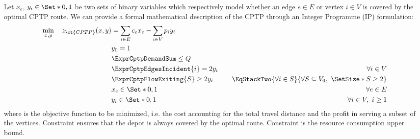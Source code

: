Let $x_{e}$, $y_{i} \in \Set*{0, 1}$ be two sets of binary variables which respectively
model whether an edge $e \in E$ or vertex $i \in V$ is covered by the optimal CPTP route.
We can provide a formal mathematical description of the CPTP through an Integer Programme (IP) formulation:
\begin{align}
	\min_{x,y} \quad z_\mt{CPTP}(x, y) & =  \sum_{i \in E} c_{e} x_{e} - \sum_{i \in V} p_i y_i \label{eq:cptp-obj-function}                                                                                                                     \\
	                                   & y_0 = 1                                                                             & \label{eq:cptp-depot-part-of-tour-constraint}                                                                     \\
	                                   & \ExprCptpDemandSum  \le Q                                                           & \label{eq:cptp-resource-upper-bound-constraint}                                                                   \\
	                                   & \ExprCptpEdgesIncident{i}  = 2 y_i                                                  & \quad \forall i \in V         \label{eq:cptp-flow-conservation-constraint}                                        \\
	                                   & \ExprCptpFlowExiting{S} \ge 2 y_{i}                                                 & \quad \EqStackTwo{\forall i \in S}{\forall S \subseteq V_0,\ \SetSize*{S} \ge 2} \label{eq:cptp-gsec-constraints} \\
	                                   & x_{e}                   \in \Set*{0, 1}                                             & \quad \forall e \in E               \label{eq:cptp-x-mip-var-bounds}                                              \\
	                                   & y_{i}                    \in \Set*{0, 1}                                            & \quad \forall i \in V,\ i \ge 1          \label{eq:cptp-y-mip-var-bounds}
\end{align}
where  is the objective function to be minimized, i.e. the cost
accounting for the total travel distance and the profit in serving a subset of the vertices.
Constraint  ensures that the depot is always covered by the optimal route.
Constraint  is the resource consumption upper bound.
